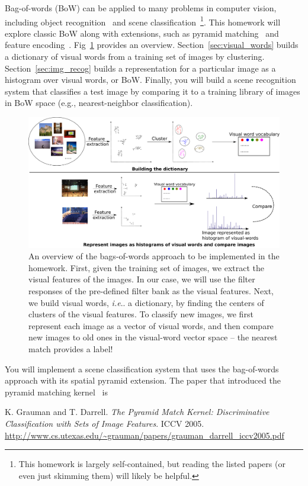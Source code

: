 \documentclass[11pt]{article}
\makeatletter
\numberwithin{equation}{section} %
\numberwithin{figure}{section} %
\numberwithin{table}{section} %
\DeclareRobustCommand\onedot{\futurelet\@let@token\@onedot}
\def\@onedot{\ifx\@let@token.\else.\null\fi\xspace}
\def\ie{\emph{i.e}\onedot} \def\Ie{\emph{I.e}\onedot}
\makeatother
\begin{document}
Bag-of-words (BoW) can be applied to many problems in computer vision, including object recognition~\cite{790410,1544935} and scene classification~\cite{renninger2004scene,5539970}\footnote{This homework is largely self-contained, but reading the listed papers (or even just skimming them) will likely be helpful.}. This homework will explore classic BoW along with extensions, such as pyramid matching~\cite{1544890,1641019} and feature encoding~\cite{Chatfield11}. Fig~\ref{fig:overview} provides an overview. Section~\ref{sec:visual_words} builds a dictionary of visual words from a training set of images by clustering. Section~\ref{sec:img_recog} builds a representation for a particular image as a histogram over visual words, or BoW. Finally, you will build a scene recognition system that classifies a test image by comparing it to a training library of images in BoW space (e.g., nearest-neighbor classification).
\begin{figure}[!h]
    \centering
    \includegraphics[width=\textwidth]{./figures/overview.pdf}
    \caption{An overview of the bags-of-words approach to be implemented in the homework. First, given the training set of images, we extract the visual features of the images. In our case, we will use the filter responses of the pre-defined filter bank as the visual features. Next, we build visual words, \ie a dictionary, by finding the centers of clusters of the visual features. To classify new images, we first represent each image as a vector of visual words, and then compare new images to old ones in the visual-word vector space -- the nearest match provides a label!}
    \label{fig:overview}
\end{figure}

\par {}
You will implement a scene classification system that uses the bag-of-words approach with its spatial pyramid extension. The paper that introduced the pyramid matching kernel~\cite{1544890} is
\begin{center}\parbox{5in}{
K. Grauman and T. Darrell. {\it The Pyramid Match Kernel: Discriminative Classification with Sets of Image Features}. ICCV 2005. \url{http://www.cs.utexas.edu/~grauman/papers/grauman_darrell_iccv2005.pdf}
}
\end{center}
\end{document}
